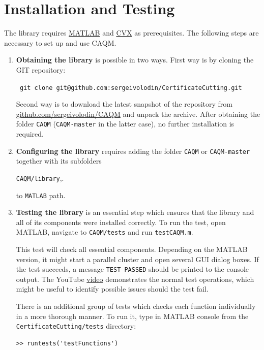 \documentclass[a4paper]{article}
\theoremstyle{definition}
\begin{document}
\section*{Installation and Testing}
The library requires \href{https://www.mathworks.com/downloads/}{MATLAB} and \href{http://cvxr.com/cvx/download/}{CVX} as prerequisites. The following steps are necessary to set up and use CAQM.
\begin{enumerate}
\item {\bf Obtaining the library} is possible in two ways. First way is by cloning the GIT  repository:
\begin{center}\tt
git clone git@github.com:sergeivolodin/CertificateCutting.git
\end{center}
Second way is to download the latest snapshot of the repository from \href{https://github.com/sergeivolodin/CAQM}{github.com/sergeivolodin/CAQM} and unpack the archive. After obtaining the folder {\tt CAQM} ({\tt CAQM-master} in the latter case), no further installation is required.

\item {\bf Configuring the library} requires adding the folder {\tt CAQM} or {\tt CAQM-master} together with its subfolders
\begin{center}
{\tt CAQM/library},.
\end{center}
to {\tt MATLAB} path. 

\item {\bf Testing the library} is an essential step which ensures that the library and all of its components were installed correctly. To run the test, open MATLAB, navigate to 
{\tt CAQM/tests} and run {\tt testCAQM.m}.

This test will check all essential components. Depending on the MATLAB version, it might start a parallel cluster and open several GUI dialog boxes. If the test succeeds, a message {\tt TEST PASSED} should be printed to the console output. The YouTube \href{https://youtu.be/Ikh_GDHnu-4}{video} demonstrates the normal test operations, which  might be useful to identify possible issues should the test fail. 

There is an additional group of tests which checks each function individually in a more thorough manner. To run it, type in MATLAB console from the {\tt CertificateCutting/tests} directory:
\begin{verbatim}
>> runtests('testFunctions')
\end{verbatim}
\end{enumerate}
\end{document}
